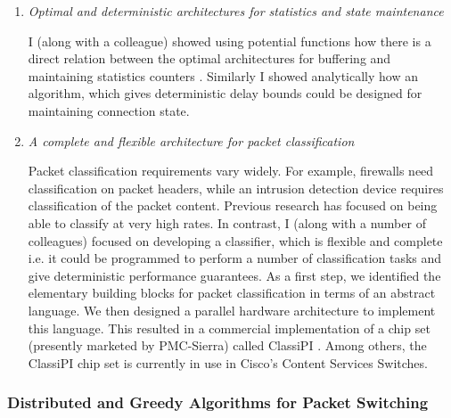 \documentclass[a4paper, 10pt]{article}
\begin{document}
\begin{small}
\begin{enumerate}
\item {\em Optimal and deterministic architectures for statistics and state maintenance}

I (along with a colleague) showed using potential functions how there is 
a direct relation between the optimal architectures for buffering
and maintaining statistics counters \cite{stats}. 
Similarly I showed analytically how an algorithm, which gives deterministic 
delay bounds could be designed for maintaining connection state. 

\item {\em A complete and flexible architecture for packet classification}



Packet classification requirements vary widely.
For example, firewalls need classification on packet headers, while an
intrusion detection device requires classification of the packet content. 
Previous research has focused on being able to classify at very
high rates. In contrast, I (along with a number of colleagues) 
focused on developing a classifier, which is flexible and complete i.e. it could be programmed to
perform a number of classification tasks and give deterministic performance guarantees.
As a first step, we identified the elementary building blocks for packet
classification in terms of an abstract language. We then designed a parallel hardware architecture
to implement this 
language. This resulted in a commercial implementation of a chip set
(presently marketed by PMC-Sierra) called ClassiPI \cite{classipi}.
Among others, the ClassiPI chip set is currently in use in Cisco's
Content Services Switches.


\end{enumerate}

\subsubsection*{\small Distributed and Greedy Algorithms for Packet Switching}



\end{small}
\end{document}
